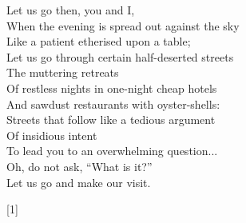\documentclass[twoside]{article}
\begin{document}
\begin{multicols}{2}
\begin{minipage}{9cm}
\begin{center}
\begin{turn}{-90}
\begin{minipage}{8cm}
    \flushright
    Let us go then, you and I,\\
    When the evening is spread out against the sky\\
    Like a patient etherised upon a table;\\
    Let us go through certain half-deserted streets\\
    The muttering retreats\\
    Of restless nights in one-night cheap hotels\\
    And sawdust restaurants with oyster-shells:\\
    Streets that follow like a tedious argument\\
    Of insidious intent\\
    To lead you to an overwhelming question...\\
    Oh, do not ask, ``What is it?''\\
    Let us go and make our visit.\\
    \begin{center}[1]\end{center}
\end{minipage}
\end{turn}
\end{center}
\end{minipage}

\end{multicols}

\begin{center}
\end{center}

\bigskip
\end{document}
